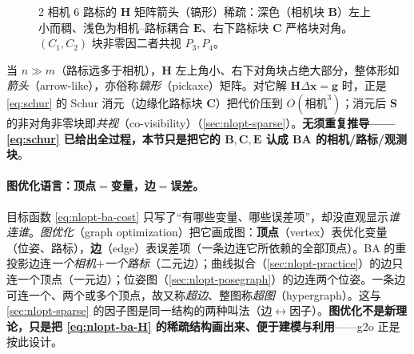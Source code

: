 \begin{figure}[H]\centering
{}
\caption{2 相机 6 路标的 $\mathbf{H}$ 矩阵箭头（镐形）稀疏：深色（相机块 $\mathbf{B}$）左上小而稠、浅色为相机--路标耦合 $\mathbf{E}$、右下路标块 $\mathbf{C}$ 严格块对角。$(C_1,C_2)$ 块非零因二者共视 $P_3,P_4$。}
\label{fig:nlopt-ba-sparsity}
\end{figure}

\noindent 当 $n\gg m$（路标远多于相机），$\mathbf{H}$ 左上角小、右下对角块占绝大部分，整体形如\emph{箭头}（arrow-like），亦俗称\emph{镐形}（pickaxe）矩阵\cite{gaoxiang2019slam14}。对它解 $\mathbf{H}\Delta\mathbf{x}=\mathbf{g}$ 时，正是 \cref{eq:schur} 的 Schur 消元（边缘化路标块 $\mathbf{C}$）把代价压到 $O(\text{相机}^3)$；消元后 $\mathbf{S}$ 的非对角非零块即\emph{共视}（co-visibility）（\cref{sec:nlopt-sparse}）。\textbf{无须重复推导——\cref{eq:schur} 已给出全过程，本节只是把它的 $\mathbf{B},\mathbf{C},\mathbf{E}$ 认成 BA 的相机/路标/观测块}。

\paragraph{图优化语言：顶点$=$变量，边$=$误差。}\cite{gaoxiang2019slam14}
目标函数 \cref{eq:nlopt-ba-cost} 只写了“有哪些变量、哪些误差项”，却没直观显示\emph{谁连谁}。\emph{图优化}（graph optimization）把它画成图：\textbf{顶点}（vertex）表优化变量（位姿、路标），\textbf{边}（edge）表误差项（一条边连它所依赖的全部顶点）。BA 的重投影边连\emph{一个相机$+$一个路标}（二元边）；曲线拟合（\cref{sec:nlopt-practice}）的边只连一个顶点（一元边）；位姿图（\cref{sec:nlopt-posegraph}）的边连两个位姿。一条边可连一个、两个或多个顶点，故又称\emph{超边}、整图称\emph{超图}（hypergraph）。这与 \cref{sec:nlopt-sparse} 的因子图是同一结构的两种叫法（边$\leftrightarrow$因子）。\textbf{图优化不是新理论，只是把 \cref{eq:nlopt-ba-H} 的稀疏结构画出来、便于建模与利用}——g2o 正是按此设计。

